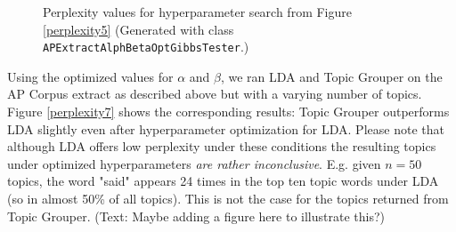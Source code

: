 \documentclass[10pt, a4paper, oneside]{article}
\begin{document}
\begin{figure}
\caption{Perplexity values for hyperparameter search from Figure \ref{perplexity5} (Generated with class \texttt{APExtractAlphBetaOptGibbsTester}.)}
\label{perplexity6}
\end{figure}

Using the optimized values for $\alpha$ and $\beta$, we ran LDA and Topic Grouper on the AP Corpus extract as described above but with a varying number of topics. Figure \ref{perplexity7} shows the corresponding results: Topic Grouper outperforms LDA slightly even after hyperparameter optimization for LDA.
Please note that although LDA offers low perplexity under these conditions the resulting topics under optimized hyperparameters \emph{are rather inconclusive}. E.g. given $n = 50$ topics, the word "said" appears 24 times in the top ten topic words under LDA (so in almost 50\% of all topics).
This is not the case for the topics returned from Topic Grouper. (Text: Maybe adding a figure here to illustrate this?)
\end{document}
